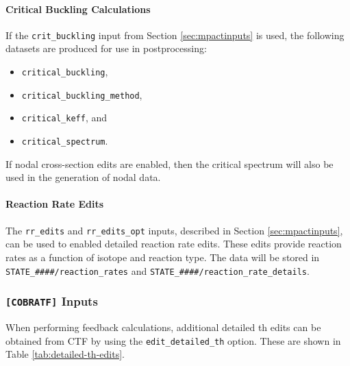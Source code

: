 \paragraph{Critical Buckling Calculations}

If the \texttt{crit\_buckling} input from Section \ref{sec:mpactinputs} is used, the following datasets are produced for use in postprocessing:
\begin{itemize}[noitemsep]
\item \texttt{critical\_buckling},
\item \texttt{critical\_buckling\_method},
\item \texttt{critical\_keff}, and
\item \texttt{critical\_spectrum}.
\end{itemize}
If nodal cross-section edits are enabled, then the critical spectrum will also be used in the generation of nodal data.

\paragraph{Reaction Rate Edits}

The \texttt{rr\_edits} and \texttt{rr\_edits\_opt} inputs, described in Section \ref{sec:mpactinputs}, can be used to enabled detailed reaction rate edits.  These edits provide reaction rates as a function of isotope and reaction type.  The data will be stored in \texttt{STATE\_\#\#\#\#/reaction\_rates} and \texttt{STATE\_\#\#\#\#/reaction\_rate\_details}.

\FloatBarrier

\subsubsection{\texttt{[COBRATF]} Inputs}

When performing feedback calculations, additional detailed \ac{th} edits can be obtained from CTF by using the \texttt{edit\_detailed\_th} option.  These are shown in Table \ref{tab:detailed-th-edits}.


